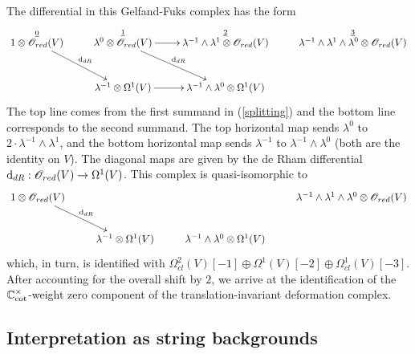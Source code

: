 The differential in this Gelfand-Fuks complex has the form
\[
\xymatrix{
\overset{\ul{0}}{1 \otimes \sO_{red}(V)} \ar[rd]^{\d_{dR}} & \overset{\ul{1}}{\lambda^0 \otimes \sO_{red}(V)} \ar[r] \ar[rd]^{\d_{dR}} & \overset{\ul{2}}{\lambda^{-1} \wedge \lambda^1 \otimes \sO_{red}(V)} & \overset{\ul{3}}{\lambda^{-1} \wedge \lambda^1 \wedge \lambda^0 \otimes \sO_{red}(V)} \\
 & \lambda^{-1} \otimes \Omega^1(V) \ar[r] & \lambda^{-1} \wedge \lambda^0 \otimes\Omega^1(V) &
}
\]
The top line comes from the first summand in (\ref{splitting}) and the bottom line corresponds to the second summand.
The top horizontal map sends $\lambda^0$ to $2 \cdot \lambda^{-1} \wedge \lambda^1$, 
and the bottom horizontal map sends $\lambda^{-1}$ to $\lambda^{-1} \wedge \lambda^0$ (both are the identity on $V$). 
The diagonal maps are given by the de Rham differential ${\rm d}_{dR} : \mathscr O_{red}(V) \to \Omega^1(V)$. 
This complex is quasi-isomorphic to 
\[
\xymatrix{
1 \otimes \sO_{red}(V) \ar[rd]^{\d_{dR}} & & & \lambda^{-1} \wedge \lambda^1 \wedge \lambda^0 \otimes \sO_{red}(V) \\
 & \lambda^{-1} \otimes \Omega^1(V) & \lambda^{-1} \wedge \lambda^0 \otimes\Omega^1(V) &
}
\]
which, in turn, is identified with $\Omega^{2}_{cl}(V)[-1] \oplus \Omega^1(V)[-2] \oplus \Omega^1_{cl}(V)[-3]$. 
After accounting for the overall shift by $2$, 
we arrive at the identification of the $\mathbb C_{\rm cot}^\times$-weight zero component of the translation-invariant deformation complex.

%
%
%
%

\subsection{Interpretation as string backgrounds}


